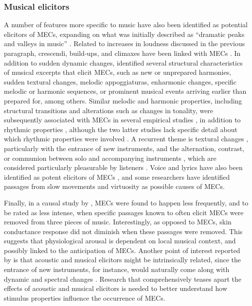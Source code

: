 \subsubsection{Musical elicitors}

A number of features more specific to music have also been identified as potential elicitors of MECs, expanding on what was initially described as ``dramatic peaks and valleys in music'' \parencite[p. 127]{goldstein1980}. Related to increases in loudness discussed in the previous paragraph, crescendi, build-ups, and climaxes have been linked with MECs \parencite{auricchio2017, bannister2018, bannister2020a, panksepp1995, polo2017, solberg2019}. In addition to sudden dynamic changes, \textcite{sloboda1991} identified several structural characteristics of musical excerpts that elicit MECs, such as new or unprepared harmonies, sudden textural changes, melodic appoggiaturas, enharmonic changes, specific melodic or harmonic sequences, or prominent musical events arriving earlier than prepared for, among others. Similar melodic and harmonic properties, including structural transitions and alterations such as changes in tonality, were subsequently associated with MECs in several empirical studies \parencite{auricchio2017, bannister2018, bannister2020a, guhn2007, mlejnek2013, schurtz2012}, in addition to rhythmic properties \parencite{schurtz2012, solberg2019}, although the two latter studies lack specific detail about which rhythmic properties were involved \parencite[for a hypothesis about optimal tempo, see][]{mcevilly1999}. A recurrent theme is textural changes \parencite{auricchio2017, polo2017, sloboda1991, solberg2019}, particularly with the entrance of new instruments, and the alternation, contrast, or communion between solo and accompanying instruments \parencite{auricchio2017, bannister2018, bannister2020a, goodchild2019, guhn2007, mlejnek2013}, which are considered particularly pleasurable by listeners \parencite{grewe2007}. Voice and lyrics have also been identified as potent elicitors of MECs \parencite{bannister2020a, schurtz2012}, and some researchers have identified passages from slow movements \parencite{guhn2007} and virtuosity \parencite{mlejnek2013} as possible causes of MECs.

Finally, in a causal study by \textcite{bannister2018}, MECs were found to happen less frequently, and to be rated as less intense, when specific passages known to often elicit MECs were removed from three pieces of music. Interestingly, as opposed to MECs, skin conductance response did not diminish when these passages were removed. This suggests that physiological arousal is dependent on local musical context, and possibly linked to the anticipation of MECs. Another point of interest reported by \textcite{bannister2018} is that acoustic and musical elicitors might be intrinsically related, since the entrance of new instruments, for instance, would naturally come along with dynamic and spectral changes \parencite[see also][]{auricchio2017}. Research that comprehensively teases apart the effects of acoustic and musical elicitors is needed to better understand how stimulus properties influence the occurrence of MECs.

